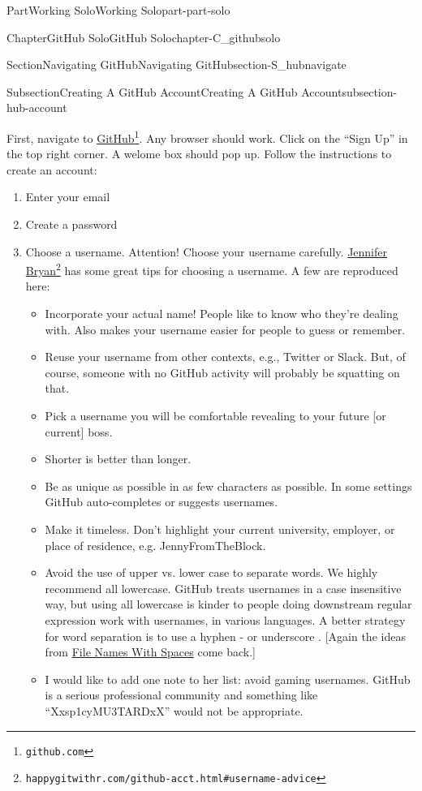 \documentclass[oneside,10pt,]{book}
\begin{document}
\begin{partptx}{Part}{Working Solo}{}{Working Solo}{}{}{part-part-solo}
\begin{chapterptx}{Chapter}{GitHub Solo}{}{GitHub Solo}{}{}{chapter-C_githubsolo}
\begin{sectionptx}{Section}{Navigating GitHub}{}{Navigating GitHub}{}{}{section-S_hubnavigate}
\begin{subsectionptx}{Subsection}{Creating A GitHub Account}{}{Creating A GitHub Account}{}{}{subsection-hub-account}
\par
First, navigate to \href{https://github.com}{GitHub}\footnote{\nolinkurl{github.com}\label{fn-hub-account-e-b}}. Any browser should work. Click on the ``Sign Up'' in the top right corner. A welome box should pop up. Follow the instructions to create an account:%
\begin{enumerate}
\item{}Enter your email%
\item{}Create a password%
\item{}Choose a username. Attention! Choose your username carefully. \href{https://happygitwithr.com/github-acct.html\#username-advice}{Jennifer Bryan}\footnote{\nolinkurl{happygitwithr.com/github-acct.html\#username-advice}\label{fn-hub-account-e-d-c-a-b}} has some great tips for choosing a username. A few are reproduced here:%
\begin{itemize}[label=\textbullet]
\item{}Incorporate your actual name! People like to know who they're dealing with. Also makes your username easier for people to guess or remember.%
\item{}Reuse your username from other contexts, e.g., Twitter or Slack. But, of course, someone with no GitHub activity will probably be squatting on that.%
\item{}Pick a username you will be comfortable revealing to your future [or current] boss.%
\item{}Shorter is better than longer.%
\item{}Be as unique as possible in as few characters as possible. In some settings GitHub auto-completes or suggests usernames.%
\item{}Make it timeless. Don't highlight your current university, employer, or place of residence, e.g. JennyFromTheBlock.%
\item{}Avoid the use of upper vs. lower case to separate words. We highly recommend all lowercase. GitHub treats usernames in a case insensitive way, but using all lowercase is kinder to people doing downstream regular expression work with usernames, in various languages. A better strategy for word separation is to use a hyphen - or underscore \textunderscore{}. [Again the ideas from \hyperlink{paragraphs-namesspaces}{File Names With Spaces} come back.]%
\item{}I would like to add one note to her list: avoid gaming usernames. GitHub is a serious professional community and something like ``Xx\textunderscore{}sp1cyMU3TARD\textunderscore{}xX'' would not be appropriate.%

\end{itemize}
\end{enumerate}
\end{subsectionptx}
\end{sectionptx}
\end{chapterptx}
\end{partptx}
\end{document}
